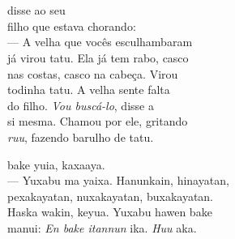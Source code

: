 \chapter*{}

\mbox{}\vspace*{\fill}



 disse ao seu\\
filho que estava chorando:\\
--- A velha que vocês esculhambaram\\
já virou tatu. Ela já tem rabo, casco\\
nas costas, casco na cabeça. Virou\\
todinha tatu. A velha sente falta\\
do filho. \textit{Vou buscá-lo}, disse a\\
si mesma. Chamou por ele, gritando\\
\textit{ruu}, fazendo barulho de tatu.

\vspace{2em}

 bake yuia, kaxaaya.\\
--- Yuxabu ma yaixa. Hanunkain, hinayatan,\\
pexakayatan, nuxakayatan, buxakayatan.\\
Haska wakin, keyua. Yuxabu hawen bake\\
manui: \emph{En bake itannun} ika. \emph{Huu} aka.

